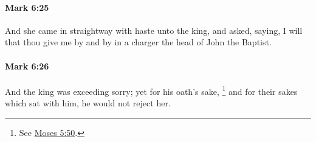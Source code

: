 		\paragraph{Mark 6:25} %
			\label{MARK-6-25}

			And she came in straightway with haste unto the king, and asked, saying, I will that thou give me by and by in a charger the head of John the Baptist.

			\begin{framed}
			\scriptsize
				\begin{compactdesc}
					\item[SBLG] 
				\end{compactdesc}
			\end{framed}

		\paragraph{Mark 6:26} %
			\label{MARK-6-26}

			And the king was exceeding sorry; yet for his oath's sake,%
				\footnote{%
					See \hyperref[MOSES-5-50]{Moses 5:50}.
					}
			and for their sakes which sat with him, he would not reject her.

